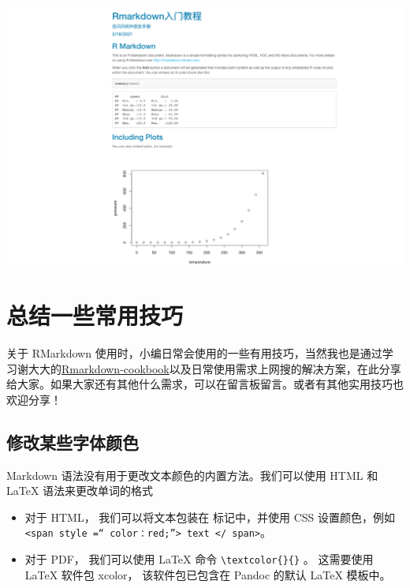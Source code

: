 \documentclass[
]{book}
\providecommand{\tightlist}{%
  \setlength{\itemsep}{0pt}\setlength{\parskip}{0pt}}
\begin{document}
\includegraphics{images/paste-8047133B.png}

\hypertarget{ux603bux7ed3ux4e00ux4e9bux5e38ux7528ux6280ux5de7}{%
\section{总结一些常用技巧}\label{ux603bux7ed3ux4e00ux4e9bux5e38ux7528ux6280ux5de7}}

关于 RMarkdown
使用时，小编日常会使用的一些有用技巧，当然我也是通过学习谢大大的\href{https://bookdown.org/yihui/rmarkdown-cookbook/}{Rmarkdown-cookbook}以及日常使用需求上网搜的解决方案，在此分享给大家。如果大家还有其他什么需求，可以在留言板留言。或者有其他实用技巧也欢迎分享！

\hypertarget{ux4feeux6539ux67d0ux4e9bux5b57ux4f53ux989cux8272}{%
\subsection{修改某些字体颜色}\label{ux4feeux6539ux67d0ux4e9bux5b57ux4f53ux989cux8272}}

Markdown 语法没有用于更改文本颜色的内置方法。我们可以使用 HTML 和 LaTeX
语法来更改单词的格式

\begin{itemize}
\tightlist
\item
  对于 HTML， 我们可以将文本包装在 标记中，并使用 CSS
  设置颜色，例如\texttt{\textless{}span\ style\ =“\ color：red;”\textgreater{}\ text\ \textless{}/\ span\textgreater{}}。
\item
  对于 PDF， 我们可以使用 LaTeX 命令 \texttt{\textbackslash{}textcolor\{\}\{\}} 。 这需要使用
  LaTeX 软件包 xcolor， 该软件包已包含在 Pandoc 的默认 LaTeX 模板中。
\end{itemize}
\end{document}
